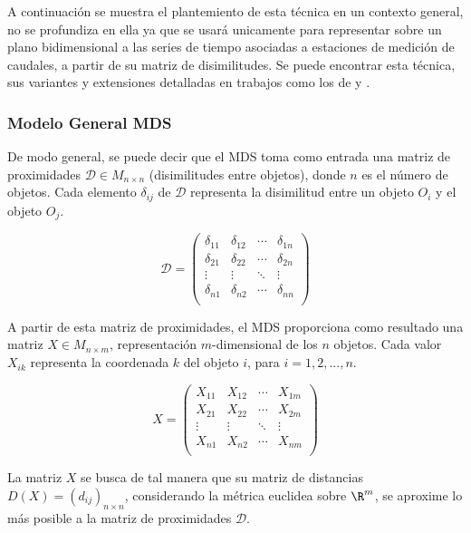 \documentclass[12pt,oneside]{book}\usepackage[]{graphicx}\usepackage[]{color}
\theoremstyle{definition} %
\begin{document}
A continuación se muestra el plantemiento de esta técnica en un contexto general, no se profundiza en ella ya que se usará unicamente para representar sobre un plano bidimensional a las series de tiempo asociadas a estaciones de medición de caudales, a partir de su matriz de disimilitudes. Se puede encontrar esta técnica, sus variantes y extensiones detalladas en trabajos como los de \citeauthor{borg2003modern} \citeyear{borg2003modern} y \citeauthor{cox2000multidimensional} \citeyear{cox2000multidimensional}.

\subsubsection{Modelo General MDS }

De modo general, se puede decir que el MDS toma como entrada una matriz de proximidades $\mathcal{D} \in M_{n \times n}$ (disimilitudes entre objetos), donde $n$ es el número de objetos. Cada elemento $\delta_{ij}$ de $\mathcal{D}$ representa la disimilitud entre un objeto $O_i$ y el objeto $O_j$.

$$ \mathcal{D} = \begin{pmatrix}
\delta_{11} & \delta_{12} & \cdots & \delta_{1n} \\
\delta_{21} & \delta_{22} & \cdots & \delta_{2n} \\
\vdots & \vdots &  \ddots & \vdots \\
\delta_{n1} & \delta_{n2} & \cdots & \delta_{nn} \\
\end{pmatrix} $$

A partir de esta matriz de proximidades, el MDS proporciona como resultado una matriz $X \in M_{n \times m}$, representación $m$-dimensional de los $n$ objetos. Cada valor $X_{ik}$ representa la coordenada $k$ del objeto $i$, para $i=1,2,...,n$. 

$$ X= \begin{pmatrix}
X_{11} & X_{12} & \cdots & X_{1m} \\
X_{21} & X_{22} & \cdots & X_{2m} \\
\vdots & \vdots &  \ddots & \vdots \\
X_{n1} & X_{n2} & \cdots & X_{nm} \\
\end{pmatrix} $$


La matriz $X$ se busca de tal manera que su matriz de distancias $D(X) = (d_{ij})_{n\times n}$, considerando la métrica euclidea sobre $\R^m$, se aproxime lo más posible a la matriz de proximidades $\mathcal{D}$.
\end{document}
